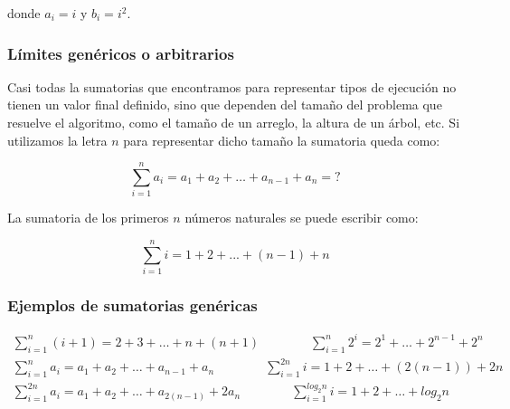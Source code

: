 donde $a_i=i$ y $b_i=i^2$.

\subsubsection{Límites genéricos o arbitrarios}

Casi todas la sumatorias que encontramos para representar tipos de ejecución no tienen un valor final definido, sino que dependen del tamaño del problema que resuelve el algoritmo, como el tamaño de un arreglo, la altura de un árbol, etc. Si utilizamos la letra $n$ para representar dicho tamaño la sumatoria queda como:

\begin{equation*}
	\sum_{i=1}^n{a_i} = a_1+a_2+\dots+a_{n-1}+a_n = ?
\end{equation*}

La sumatoria de los primeros $n$ números naturales se puede escribir como:

\begin{equation*}
	\sum_{i=1}^n{i} = 1+2+...+ (n-1) + n 
\end{equation*}


\subsubsection{Ejemplos de sumatorias genéricas}

\begin{gather*}
\sum_{i=1}^n{(i+1)} = 2+3+\dots+n+(n+1) \hspace{4em} \sum_{i=1}^n{2^i} = 2^1+\dots+2^{n-1}+2^n \\
\sum_{i=1}^n{a_i} = a_1+a_2+\dots+a_{n-1}+a_n \hspace{4em} \sum_{i=1}^{2n}{i} = 1+2+\dots+(2(n-1))+2n \\
\sum_{i=1}^{2n}{a_i} = a_1+a_2+\dots+a_{2(n-1)}+2 a_n \hspace{4em} \sum_{i=1}^{log_2 n}{i} = 1+2+\dots+log_2 n
\end{gather*}


